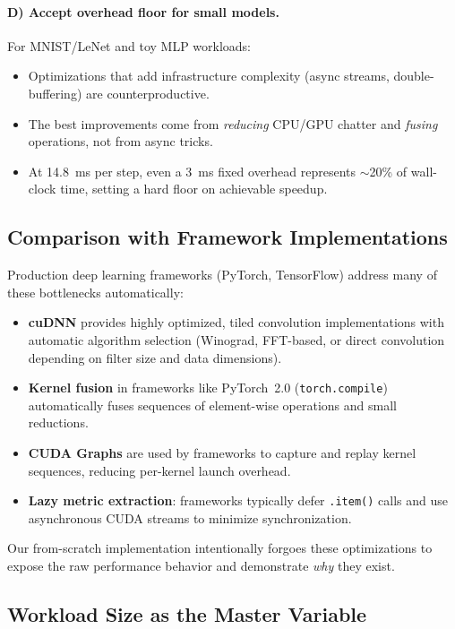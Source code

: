 \documentclass[10pt,twocolumn,letterpaper]{article}
\begin{document}
\paragraph{D) Accept overhead floor for small models.}
For MNIST/LeNet and toy MLP workloads:
\begin{itemize}[nosep,leftmargin=*]
  \item Optimizations that add infrastructure complexity (async streams, double-buffering) are counterproductive.
  \item The best improvements come from \emph{reducing} CPU/GPU chatter and \emph{fusing} operations, not from async tricks.
  \item At 14.8~ms per step, even a 3~ms fixed overhead represents $\sim$20\% of wall-clock time, setting a hard floor on achievable speedup.
\end{itemize}

\subsection{Comparison with Framework Implementations}

Production deep learning frameworks (PyTorch, TensorFlow) address many of these bottlenecks automatically:
\begin{itemize}[nosep,leftmargin=*]
  \item \textbf{cuDNN} provides highly optimized, tiled convolution implementations with automatic algorithm selection (Winograd, FFT-based, or direct convolution depending on filter size and data dimensions).
  \item \textbf{Kernel fusion} in frameworks like PyTorch~2.0 (\texttt{torch.compile}) automatically fuses sequences of element-wise operations and small reductions.
  \item \textbf{CUDA Graphs} are used by frameworks to capture and replay kernel sequences, reducing per-kernel launch overhead.
  \item \textbf{Lazy metric extraction}: frameworks typically defer \texttt{.item()} calls and use asynchronous CUDA streams to minimize synchronization.
\end{itemize}

Our from-scratch implementation intentionally forgoes these optimizations to expose the raw performance behavior and demonstrate \emph{why} they exist.

\subsection{Workload Size as the Master Variable}
\end{document}
